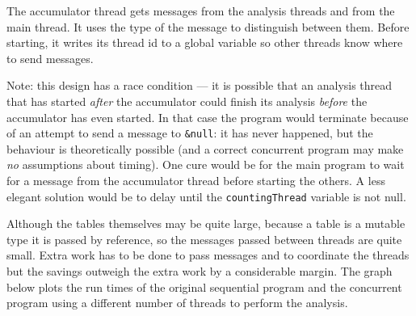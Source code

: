 The accumulator thread gets messages from the analysis threads and from the main
thread. It uses the type of the message to distinguish between them. Before
starting, it writes its thread id to a global variable so other threads know
where to send messages. 
{\small
{}
}

Note: this design has a race condition --- it is possible that an analysis
thread that has started {\em after} the accumulator could finish its analysis
{\em before} the accumulator has even started. In that case the program would
terminate because of an attempt to send a message to \texttt{\&null}: it has
never happened, but the behaviour is theoretically possible (and a correct
concurrent program may make {\em no} assumptions about timing). One cure would
be for the main program to wait for a message from the accumulator thread before
starting the others. A less elegant solution would be to delay until the
\texttt{countingThread} variable is not null.

Although the tables themselves may be quite large, because a table is a mutable
type it is passed by reference, so the messages passed between threads are quite
small. Extra work has to be done to pass messages and to coordinate the threads
but the savings outweigh the extra work by a considerable margin. The graph
below plots the run times of the original sequential program and the concurrent
program using a different number of threads to perform the analysis.

